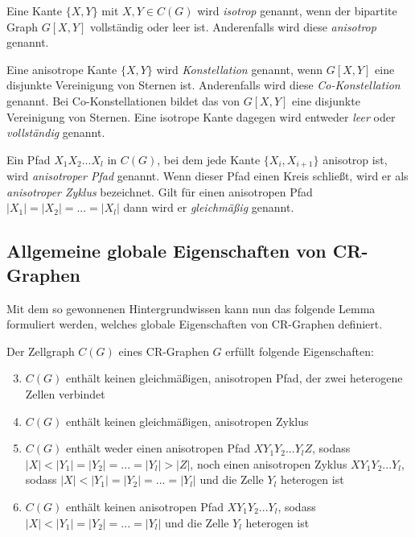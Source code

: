 \begin{Definition}
	Eine Kante $\{X,Y\}$ mit $X,Y\in C(G)$ wird \emph{isotrop} genannt, wenn der bipartite Graph $G[X,Y]$ vollständig oder leer ist. Anderenfalls wird diese \emph{anisotrop} genannt.
\end{Definition}

\begin{Definition}
	Eine anisotrope Kante $\{X,Y\}$ wird \emph{Konstellation} genannt, wenn $G[X,Y]$ eine disjunkte Vereinigung von Sternen ist.
	Anderenfalls wird diese \emph{Co-Konstellation} genannt.
	Bei Co-Konstellationen bildet das  von $G[X,Y]$ eine disjunkte Vereinigung von Sternen.
	Eine isotrope Kante dagegen wird entweder \emph{leer} oder \emph{vollständig} genannt.
\end{Definition}

\begin{Definition}
	 Ein Pfad $X_1X_2...X_l$ in $C(G)$, bei dem jede Kante $\{X_i,X_{i+1}\}$ anisotrop ist, wird \emph{anisotroper Pfad} genannt. Wenn dieser Pfad einen Kreis schließt, wird er als \emph{anisotroper Zyklus} bezeichnet. Gilt für einen anisotropen Pfad $|X_1|=|X_2|=...=|X_l|$ dann wird er \emph{gleichmäßig} genannt.
\end{Definition}

\subsection{Allgemeine globale Eigenschaften von CR-Graphen}
Mit dem so gewonnenen Hintergrundwissen kann nun das folgende Lemma formuliert werden, welches globale Eigenschaften von CR-Graphen definiert.

\begin{Lemma}
	Der Zellgraph $C(G)$ eines CR-Graphen $G$ erfüllt folgende Eigenschaften:

	\begin{enumerate}[label=(\Alph*)]
		\setcounter{enumi}{2}
		\item $C(G)$ enthält keinen gleichmäßigen, anisotropen Pfad, der zwei heterogene Zellen verbindet
		\item $C(G)$ enthält keinen gleichmäßigen, anisotropen Zyklus
		\item $C(G)$ enthält weder einen anisotropen Pfad $XY_1Y_2...Y_lZ$, sodass $|X|<|Y_1|=|Y_2|=...=|Y_l|>|Z|$, noch einen anisotropen Zyklus $XY_1Y_2...Y_l$, sodass $|X|<|Y_1|=|Y_2|=...=|Y_l|$ und die Zelle $Y_l$ heterogen ist
		\item $C(G)$ enthält keinen anisotropen Pfad $XY_1Y_2...Y_l$, sodass $|X|<|Y_1|=|Y_2|=...=|Y_l|$ und die Zelle $Y_l$ heterogen ist
	\end{enumerate}
	\label{lemma:global1}
\end{Lemma}

